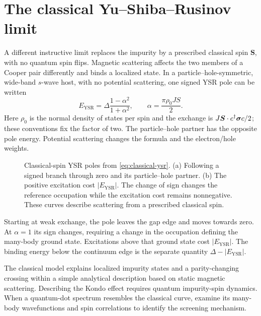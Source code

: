 \section{The classical Yu--Shiba--Rusinov limit}\label{sec:classical-ysr}

A different instructive limit replaces the impurity by a prescribed classical
spin $\bm S$, with no quantum spin flips. Magnetic scattering affects the two
members of a Cooper pair differently and binds a localized state. In a
particle--hole-symmetric, wide-band $s$-wave host, with no potential scattering,
one signed YSR pole can be written~\cite{yu1965bound,shiba1968classical,rusinov1969superconductivity,balatsky2006impurity}
\begin{equation}\label{eq:classical-ysr}
 E_{\mathrm{YSR}}=\Delta\frac{1-\alpha^2}{1+\alpha^2},\qquad
 \alpha=\frac{\pi\rho_0JS}{2}.
\end{equation}
Here $\rho_0$ is the normal density of states per spin and the exchange is
$J\bm S\cdot c^\dagger\bm\sigma c/2$; these conventions fix the factor of two.
The particle--hole partner has the opposite pole energy. Potential scattering
changes the formula and the electron/hole weights.

\begin{figure}[htb]
\centering{}
\caption{Classical-spin YSR poles from \cref{eq:classical-ysr}. (a) Following a
signed branch through zero and its particle--hole partner. (b) The positive
excitation cost $|E_{\mathrm{YSR}}|$. The change of sign changes the reference
occupation while the excitation cost remains nonnegative. These curves describe
scattering from a prescribed classical spin.}
\label{fig:primer-ysr}
\end{figure}

Starting at weak exchange, the pole leaves the gap edge and moves towards zero.
At $\alpha=1$ its sign changes, requiring a change in the occupation defining the
many-body ground state. Excitations above that ground state cost $|E_{\mathrm{YSR}}|$.
The binding energy below the continuum edge is the separate quantity
$\Delta-|E_{\mathrm{YSR}}|$.

The classical model explains localized impurity states and a parity-changing
crossing within a simple analytical description based on static magnetic scattering.
Describing the Kondo effect requires quantum impurity-spin dynamics. When a
quantum-dot spectrum resembles the classical curve, examine its many-body
wavefunctions and spin correlations to identify the screening mechanism.

